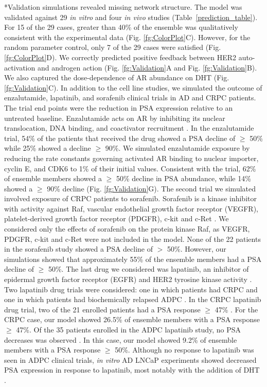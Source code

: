 \documentclass[12pt]{article}
\makeatletter
\renewcommand\subsection{\@startsection
	{subsection}{2}{0mm}
	{-0.05in}
	{-0.5\baselineskip}
	{\normalfont\normalsize\bfseries}}
\makeatother
\begin{document}
\subsection*{Validation simulations revealed missing network structure.} 
The model was validated against 29 \textit{in vitro} and four \textit{in vivo} studies (Table~\ref{prediction_table}). 
For 15 of the 29 cases, greater than 40\% of the ensemble was qualitatively consistent with the experimental data (Fig. \ref{fg:ColorPlot}C). 
However, for the random parameter control, only 7 of the 29 cases were satisfied (Fig. \ref{fg:ColorPlot}D). 
We correctly predicted positive feedback between HER2 auto-activation and androgen action (Fig. \ref{fg:Validation}A and Fig. \ref{fg:Validation}B). 
We also captured the dose-dependence of AR abundance on DHT (Fig. \ref{fg:Validation}C). 
In addition to the cell line studies, we simulated the outcome of enzalutamide, lapatinib, and sorafenib clinical trials in AD and CRPC patients. 
The trial end points were the reduction in PSA expression relative to an untreated baseline.  
Enzalutamide acts on AR by inhibiting its nuclear translocation, DNA binding, and coactivator recruitment \cite{Scher2012}. 
In the enzalutamide trial, 54\% of the patients that received the drug showed a PSA decline of $\geq$ 50\% while 25\% showed a decline $\geq$ 90\%. 
We simulated enzalutamide exposure by reducing the rate constants governing activated AR binding to nuclear importer, cyclin E, and CDK6 to 1\% of their initial values. 
Consistent with the trial, 62\% of ensemble members showed a $\geq$ 50\% decline in PSA abundance, while 14\% showed a $\geq$ 90\% decline (Fig. \ref{fg:Validation}G). 
The second trial we simulated involved exposure of CRPC patients to sorafenib. 
Sorafenib is a kinase inhibitor with activity against Raf, vascular endothelial growth factor receptor (VEGFR), platelet-derived growth factor receptor (PDGFR), c-kit and c-Ret \cite{Dahut2008}. 
We considered only the effects of sorafenib on the protein kinase Raf, as VEGFR, PDGFR, c-kit and c-Ret were not included in the model. 
None of the 22 patients in the sorafenib study showed a PSA decline of $>$ 50\%. 
However, our simulations showed that approximately 55\% of the ensemble members had a PSA decline of $\geq$ 50\%. 
The last drug we considered was lapatinib, an inhibitor of epidermal growth factor receptor (EGFR) and HER2 tyrosine kinase activity \cite{Liu2013}. 
Two lapatinib drug trials were considered: one in which patients had CRPC and one in which patients had biochemically relapsed ADPC \cite{Whang2013,Liu2013}. 
In the CRPC lapatinib drug trial, two of the 21 enrolled patients had a PSA response $\geq$ 47\%  \cite{Whang2013}. 
For the CRPC case, our model showed 26.5\% of ensemble members with a PSA response $\geq$ 47\%. 
Of the 35 patients enrolled in the ADPC lapatinib study, no PSA decreases was observed \cite{Liu2013}. 
In this case, our model showed 9.2\% of ensemble members with a PSA response $\geq$ 50\%.
Although no response to lapatinib was seen in ADPC clinical trials, \textit{in vitro} AD LNCaP experiments showed decreased PSA expression in response to lapatinib, most notably with the addition of DHT \cite{Liu2005}. 
\end{document}
